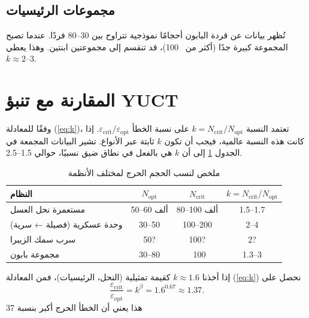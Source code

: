 \documentclass[12pt]{article}
\theoremstyle{remark}
\begin{document}
	\subsection{مجموعات الرئيسيات}
	\label{subsec:primates}
	
	تُظهر بيانات عن قردة البابون \cite{Alberts1995} أحجامًا نموذجية تتراوح بين 30–80 فردًا. عندما تصبح المجموعة كبيرة جدًا (أكثر من ~100)، قد تنقسم إلى مجموعتين ابنتين. وهذا يعطي \(k \approx 2\)–\(3\).
	
	\section{المقارنة مع تنبؤ YUCT}
	\label{sec:comparison}
	
	وفقًا للمعادلة (\ref{eq:k})، تعتمد النسبة \(k = N_{\text{crit}}/N_{\text{opt}}\) على نسبة الخطأ \(\varepsilon_{\text{crit}}/\varepsilon_{\text{opt}}\). إذا كانت هذه النسبة عالمية، فيجب أن تكون \(k\) ثابتة عبر الأنواع. تشير البيانات المجمعة في الجدول \ref{tab:summary} إلى أن \(k\) هي بالفعل في نطاق ضيق نسبيًا، حوالي 1.5–2.5.
	
	\begin{table}[htbp]
		\centering
		\caption{ملخص لنسب الحجم الحرج لمختلف الأنظمة}
		\label{tab:summary}
		\begin{tabular}{lccc}
			\toprule
			\textbf{النظام} & \(N_{\text{opt}}\) & \(N_{\text{crit}}\) & \(k = N_{\text{crit}}/N_{\text{opt}}\) \\
			\midrule
			مستعمرة نحل العسل & 50–60 ألف & 80–100 ألف & 1.5–1.7 \\
			وحدة عسكرية (فصيلة ← سرية) & 30–50 & 100–200 & 2–4 \\
			سرب سمك الزيبرا & 50? & 100? & 2? \\
			مجموعة بابون & 30–80 & ~100 & 1.3–3 \\
			\bottomrule
		\end{tabular}
	\end{table}
	
	إذا أخذنا \(k \approx 1.6\) كقيمة تمثيلية (النحل، الرئيسيات)، فمن المعادلة (\ref{eq:k}) نحصل على
	\[
	\frac{\varepsilon_{\text{crit}}}{\varepsilon_{\text{opt}}} = k^{\beta} = 1.6^{0.67} \approx 1.37.
	\]
	هذا يعني أن الخطأ الحرج أكبر بنسبة 37%
	
\end{document}

